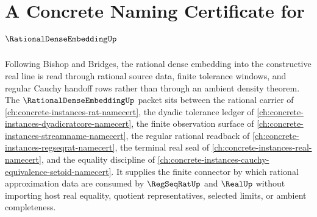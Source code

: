 \chapter{A Concrete Naming Certificate for $\RationalDenseEmbeddingUp$}
\label{ch:concrete-instances-rational-dense-embedding-namecert}

Following Bishop and Bridges, the rational dense embedding into the constructive real line is read through rational source data, finite tolerance windows, and regular Cauchy handoff rows rather than through an ambient density theorem. The $\RationalDenseEmbeddingUp$ packet sits between the rational carrier of \autoref{ch:concrete-instances-rat-namecert}, the dyadic tolerance ledger of \autoref{ch:concrete-instances-dyadicratcore-namecert}, the finite observation surface of \autoref{ch:concrete-instances-streamname-namecert}, the regular rational readback of \autoref{ch:concrete-instances-regseqrat-namecert}, the terminal real seal of \autoref{ch:concrete-instances-real-namecert}, and the equality discipline of \autoref{ch:concrete-instances-cauchy-equivalence-setoid-namecert}. It supplies the finite connector by which rational approximation data are consumed by $\RegSeqRatUp$ and $\RealUp$ without importing host real equality, quotient representatives, selected limits, or ambient completeness.

